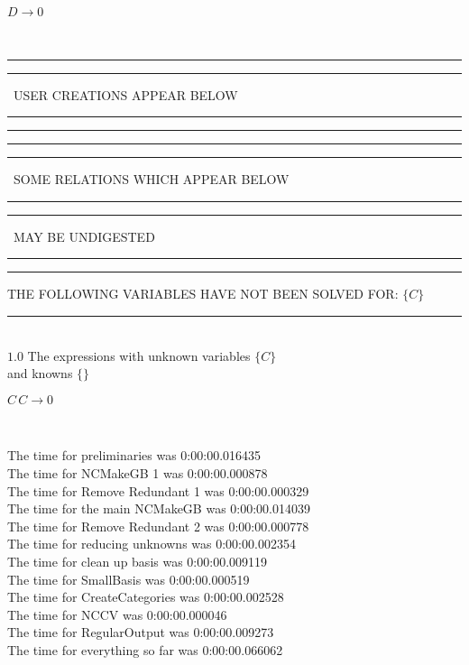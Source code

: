 \documentclass[rep10,leqno]{report}
\begin{document}
\begin{minipage}{6in}
$
D\rightarrow 0
$
\end{minipage}\medskip\\
\rule[2pt]{6in}{1pt}\hfil\break
\rule[2.5pt]{1.701in}{1pt}
\ USER CREATIONS APPEAR BELOW\ 
\rule[2.5pt]{1.701in}{1pt}\hfil\break
\rule[2pt]{6in}{1pt}\hfil\break
\rule[2pt]{6in}{4pt}\hfil\break
\rule[2pt]{1.45in}{4pt}
\ SOME RELATIONS WHICH APPEAR BELOW\ 
\rule[2pt]{1.45in}{4pt}\hfil\break
\rule[2pt]{2.18in}{4pt}
\ MAY BE UNDIGESTED\ 
\rule[2pt]{2.18in}{4pt}\hfil\break
\rule[2pt]{6in}{4pt}\hfil\break
THE FOLLOWING VARIABLES HAVE NOT BEEN SOLVED FOR:\hfil\break
$\{C\}$
\smallskip\\
\rule[3pt]{6in}{.7pt}\\
$1.0$  The expressions with unknown variables $\{C\}$\\
and knowns $\{\}$\smallskip\\
\begin{minipage}{6in}
$
C\,
 C\rightarrow 0
$
\end{minipage}\\
\vspace{10pt}

\noindent
The time for preliminaries was 0:00:00.016435\\
The time for NCMakeGB 1 was 0:00:00.000878\\
The time for Remove Redundant 1 was 0:00:00.000329\\
The time for the main NCMakeGB was 0:00:00.014039\\
The time for Remove Redundant 2 was 0:00:00.000778\\
The time for reducing unknowns was 0:00:00.002354\\
The time for clean up basis was 0:00:00.009119\\
The time for SmallBasis was 0:00:00.000519\\
The time for CreateCategories was 0:00:00.002528\\
The time for NCCV was 0:00:00.000046\\
The time for RegularOutput was 0:00:00.009273\\
The time for everything so far was 0:00:00.066062\\
\end{document}
